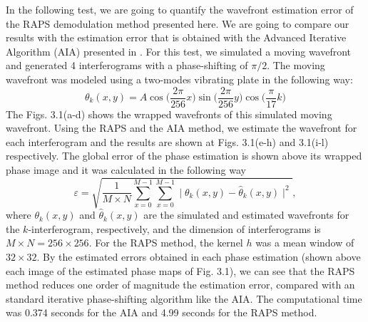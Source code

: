 In the following test, we are going to quantify the wavefront estimation error
of the RAPS demodulation method presented here. We are going to compare our
results with the estimation error that is obtained with the Advanced Iterative
Algorithm (AIA) presented in \cite{Wang:04}. For this test, we simulated a
moving wavefront and generated 4 interferograms with a phase-shifting of
$\pi/2$. The moving wavefront was modeled using a two-modes vibrating plate in
the following way:
\begin{equation}
 \theta_k (x,y) = A \cos \Big( \frac{2\pi}{256}x \Big) \sin \Big(
\frac{2\pi}{256}y \Big) \cos \Big( \frac{\pi}{17}k \Big)
\end{equation}
The Figs. 3.1(a-d) shows the wrapped wavefronts of this simulated moving
wavefront. Using the RAPS and the AIA method, we estimate the wavefront for each
interferogram and the results are shown at Figs. 3.1(e-h) and 3.1(i-l)
respectively. The global error of the phase estimation is shown above its
wrapped phase image and it was calculated in the following way
\begin{equation}
 \varepsilon = \sqrt{\frac{1}{M \times N} 
 \sum_{x=0}^{M-1} \sum_{x=0}^{M-1} 
 \mid \theta_{k}(x,y)-\hat{\theta}_{k}(x,y) \mid^2},
\end{equation}
where $\theta_{k}(x,y)$ and $\hat{\theta}_{k}(x,y)$ are the simulated and
estimated wavefronts for the $k$-interferogram, respectively, and the dimension
of interferograms is $M\times N = 256 \times 256$. For the RAPS method, the
kernel $h$ was a mean window of $32 \times 32$. By the estimated errors obtained
in each phase estimation (shown above each image of the estimated phase maps of
Fig. 3.1), we can see that the RAPS method reduces one order of magnitude the
estimation error, compared with an standard iterative phase-shifting algorithm
like the AIA. The computational time was 0.374 seconds for the AIA and 4.99
seconds for the RAPS method.

